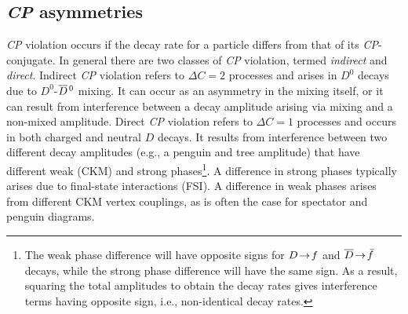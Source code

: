 \subsection{\emph{CP} asymmetries}\label{sec:cp_asym}

\emph{CP} violation occurs if the decay rate for a particle differs 
from that of its \emph{CP}-conjugate\cite{Bigi:2000yz}. 
In general there are two classes of \emph{CP} violation, termed
{\it indirect\/} and {\it direct\/}\cite{Nir:1999mg}. Indirect \emph{CP} 
violation refers to $\Delta C\!=\!2$ processes and 
arises in $D^0$ decays due to $D^0$-$\overline{D}{}^{\,0}$ mixing. 
It can occur as an asymmetry in the mixing itself, or it can 
result from interference between a decay 
amplitude arising via mixing and a non-mixed amplitude. 
Direct \emph{CP} violation refers to
$\Delta C\!=\!1$ processes and occurs in both charged and neutral 
$D$ decays. It results from interference between two different decay
amplitudes (e.g., a penguin and tree amplitude) that have
different weak (CKM) and strong phases\footnote{The weak 
phase difference will have opposite signs for $D\!\rightarrow\! f$ and 
$\overline{D}\!\rightarrow\!\bar{f}$ decays, while the strong phase difference 
will have the same sign. As a result, squaring the total amplitudes 
to obtain the decay rates gives interference terms having 
opposite sign, i.e., non-identical decay rates.}.
A difference in strong phases typically arises due to 
final-state interactions (FSI)\cite{Buccella:1994nf}. A difference
in weak phases arises from different CKM vertex couplings, as 
is often the case for spectator and penguin diagrams.


